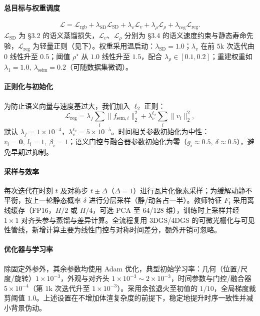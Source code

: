 \documentclass[10pt,conference]{IEEEtran} %
\begin{document}
\paragraph{总目标与权重调度}
\begin{equation}
\mathcal L=\mathcal L_{\mathrm{rgb}}+\lambda_{\mathrm{SD}}\mathcal L_{\mathrm{SD}}
+\lambda_v \mathcal L_v+\lambda_\rho \mathcal L_\rho+\lambda_{\mathrm{reg}}\mathcal L_{\mathrm{reg}}.
\label{eq:opt_total}
\end{equation}
$\mathcal L_{\mathrm{SD}}$ 为 §3.2 的语义蒸馏损失，$\mathcal L_v$、$\mathcal L_\rho$ 分别为 §3.4 的语义速度约束与静态寿命先验，$\mathcal L_{\mathrm{reg}}$ 为轻量正则（见下）。权重采用温启动：$\lambda_{\mathrm{SD}}{=}1.0$；$\lambda_v$ 在前 $5$k 次迭代由 $0$ 线性升至 $0.5$；阈值 $\rho^\star$ 从 $1.0$ 线性升至 $1.5$，配合 $\lambda_\rho\in[0.1,0.2]$；重建权重如 $\lambda_{1}{=}1.0,\ \lambda_{\mathrm{ssim}}{=}0.2$（可随数据集微调）。

\paragraph{正则化与初始化}
为防止语义向量与速度基过大，我们加入 $\ell_2$ 正则：
\begin{equation}
\mathcal L_{\mathrm{reg}}=\lambda_f\sum_i \|f_{\mathrm{sem},i}\|_2^2+\lambda_v^{\ell_2}\sum_i \|v_i\|_2^2,
\end{equation}
默认 $\lambda_f{=}1\!\times\!10^{-4}$，$\lambda_v^{\ell_2}{=}5\!\times\!10^{-5}$。时间相关参数初始化为中性：$v_i{=}\mathbf 0,\ l_i{=}1,\ \beta_i{=}1$；语义门控与融合器参数初始化为零（$g_i\!\approx\!0.5,\ \delta\!\approx\!0.5$），避免早期过抑制。

\paragraph{采样与效率}
每次迭代在时刻 $t$ 及对称步 $t\pm\Delta$（$\Delta{=}1$）进行瓦片化像素采样；为缓解动静不平衡，按上一轮静态概率 $\delta$ 进行分层采样（静/动各占一半）。教师特征 $F_t$ 采用离线缓存（FP16，$H/2$ 或 $H/4$，可选 PCA 至 64/128 维），训练时上采样并经 $1{\times}1$ 对齐头参与蒸馏与差异计算。全流程复用 3DGS/4DGS 的可微光栅化与可见性管线，新增计算主要为线性门控与对称时间差分，额外开销可忽略。

\paragraph{优化器与学习率}
除固定外参外，其余参数均使用 Adam 优化，典型初始学习率：几何（位置/尺度/旋转）$1\!\times\!10^{-3}$，外观与对齐头 $1\!\times\!10^{-3}\!\sim\!2\!\times\!10^{-3}$，时间参数与门控/融合器 $5\!\times\!10^{-4}$（第 $1$k 次迭代升至 $1\!\times\!10^{-3}$）。采用余弦退火至初值的 $1/10$，全局梯度裁剪阈值 $1.0$。上述设置在不增加体渲复杂度的前提下，稳定地提升时序一致性并减小背景伪动。
\end{document}
